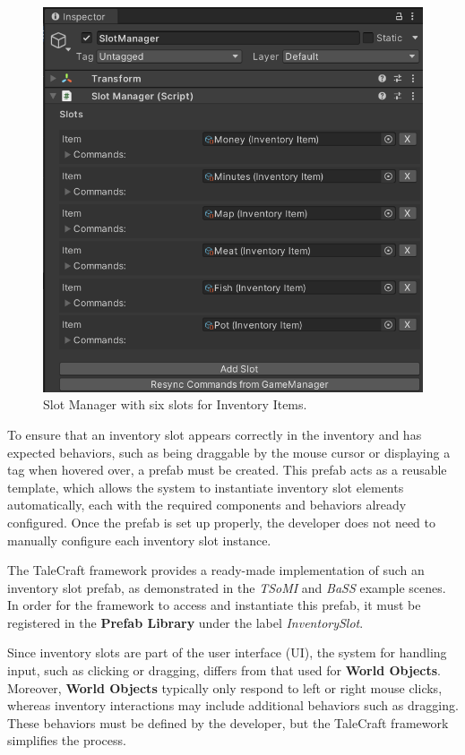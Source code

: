 \begin{figure}[H]
\centering
\includegraphics[width=.7\linewidth]{img/image_2025-07-05_133040354.png}
\caption{Slot Manager with six slots for Inventory Items.}
\label{fig:Manual-SM}
\end{figure}

To ensure that an inventory slot appears correctly in the inventory and has expected behaviors, such as being draggable by the mouse cursor or displaying a tag when hovered over, a prefab must be created. This prefab acts as a reusable template, which allows the system to instantiate inventory slot elements automatically, each with the required components and behaviors already configured. Once the prefab is set up properly, the developer does not need to manually configure each inventory slot instance.

The TaleCraft framework provides a ready-made implementation of such an inventory slot prefab, as demonstrated in the \textit{TSoMI} and \textit{BaSS} example scenes. In order for the framework to access and instantiate this prefab, it must be registered in the \textbf{Prefab Library} under the label \textit{InventorySlot}.

Since inventory slots are part of the user interface (UI), the system for handling input, such as clicking or dragging, differs from that used for \textbf{World Objects}. Moreover, \textbf{World Objects} typically only respond to left or right mouse clicks, whereas inventory interactions may include additional behaviors such as dragging. These behaviors must be defined by the developer, but the TaleCraft framework simplifies the process.


